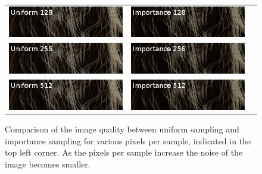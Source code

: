 \documentclass[11pt,a4paper]{report}
\begin{document}
\begin{figure}
\begin{center}
\begin{tabular}{ccc}
\includegraphics[scale=0.6]{variance-results/un128.png} & \includegraphics[scale=0.6]{variance-results/is128.png} \\
\includegraphics[scale=0.6]{variance-results/un256.png} & \includegraphics[scale=0.6]{variance-results/is256.png} \\
\includegraphics[scale=0.6]{variance-results/un512.png} & \includegraphics[scale=0.6]{variance-results/is512.png} \\

\end{tabular}
\egroup
\end{center}
\caption{Comparison of the image quality between uniform sampling and importance sampling for various pixels per sample, indicated in the top left corner. As the pixels per sample increase the noise of the image becomes smaller.}
\label{fig_side_by_side}
\end{figure}
\end{document}
